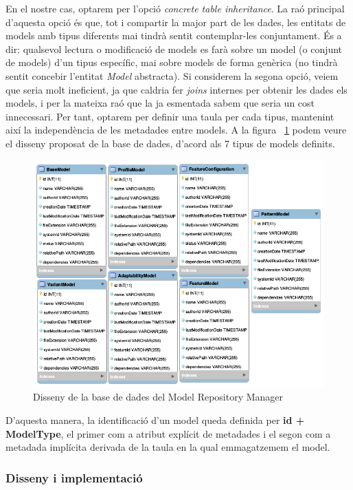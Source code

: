 En el nostre cas, optarem per l'opció \textit{concrete table inheritance}. La raó principal d'aquesta opció és que, tot i compartir la major part de les dades, les entitats de models amb tipus diferents mai tindrà sentit contemplar-les conjuntament. És a dir: qualsevol lectura o modificació de models es farà sobre un model (o conjunt de models) d'un tipus específic, mai sobre models de forma genèrica (no tindrà sentit concebir l'entitat \textit{Model} abstracta). Si considerem la segona opció, veiem que seria molt ineficient, ja que caldria fer \textit{joins} internes per obtenir les dades els models, i per la mateixa raó que la ja esmentada sabem que seria un cost innecessari. Per tant, optarem per definir una taula per cada tipus, mantenint així la independència de les metadades entre models. A la figura ~\ref{fig:modelrepository} podem veure el disseny proposat de la base de dades, d'acord als 7 tipus de models definits.\\

\begin{figure}[!h]
\centering
\includegraphics[width=14cm]{Figures/modelrepositorydb}
\decoRule
\caption{Disseny de la base de dades del Model Repository Manager}
\label{fig:modelrepository}
\end{figure}

D'aquesta manera, la identificació d'un model queda definida per \textbf{id + ModelType}, el primer com a atribut explícit de metadades i el segon com a metadada implícita derivada de la taula en la qual emmagatzemem el model.

\subsubsection{Disseny i implementació}

